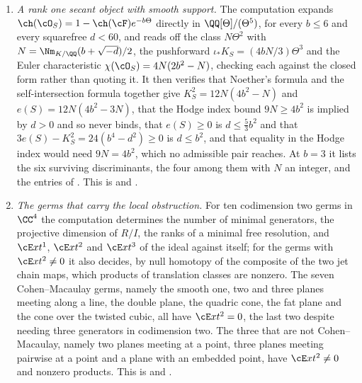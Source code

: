 \begin{enumerate}[label=\textup{(\Roman*)},leftmargin=*]
\item \emph{A rank one secant object with smooth support.} The computation
  expands $\ch(\cO_{S})=1-\ch(\cF)e^{-b\Theta}$ directly in
  $\QQ[\Theta]/(\Theta^{5})$, for every $b\le6$ and every squarefree $d<60$,
  and reads off the class $N\Theta^{2}$ with
  $N=\Nm_{K/\QQ}(b+\sqrt{-d})/2$, the pushforward
  $\iota_{*}K_{S}=(4bN/3)\Theta^{3}$ and the Euler characteristic
  $\chi(\cO_{S})=4N(2b^{2}-N)$, checking each against the closed form rather
  than quoting it. It then verifies that Noether's formula and the
  self-intersection formula together give $K_{S}^{2}=12N(4b^{2}-N)$ and
  $e(S)=12N(4b^{2}-3N)$, that the Hodge index bound $9N\ge4b^{2}$ is implied
  by $d>0$ and so never binds, that $e(S)\ge0$ is $d\le\tfrac53b^{2}$ and that
  $3e(S)-K_{S}^{2}=24(b^{4}-d^{2})\ge0$ is $d\le b^{2}$, and that equality in
  the Hodge index would need $9N=4b^{2}$, which no admissible pair reaches.
  At $b=3$ it lists the six surviving discriminants, the four among them with
  $N$ an integer, and the entries of . This is
   and .

\item \emph{The germs that carry the local obstruction.} For ten
  codimension two germs in $\CC^{4}$ the computation determines the number of
  minimal generators, the projective dimension of $R/I$, the ranks of a
  minimal free resolution, and $\cE xt^{1}$, $\cE xt^{2}$ and $\cE xt^{3}$ of
  the ideal against itself; for the germs with $\cE xt^{2}\ne0$ it also
  decides, by null homotopy of the composite of the two jet chain maps, which
  products of translation classes are nonzero. The seven Cohen--Macaulay germs, namely the smooth one, two
  and three planes meeting along a line, the double plane, the quadric cone,
  the fat plane and the cone over the twisted cubic, all have
  $\cE xt^{2}=0$, the last two despite needing three generators in codimension
  two. The three that are not Cohen--Macaulay, namely two planes meeting at a
  point, three planes meeting pairwise at a point and a plane with an embedded
  point, have $\cE xt^{2}\ne0$ and nonzero products. This is
   and .


\end{enumerate}
